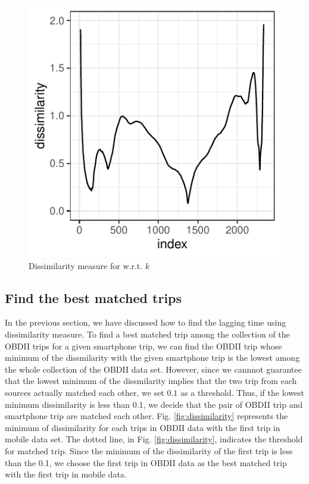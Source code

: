 \documentclass[letterpaper,9pt,twocolumn,twoside,]{pinp}
\begin{document}
\begin{figure}

{\centering \includegraphics{report_issaclee_files/figure-latex/laggedtime-1} 

}

\caption{Dissimilarity measure for w.r.t. $k$}\label{fig:laggedtime}
\end{figure}

\hypertarget{find-the-best-matched-trips}{%
\subsection{Find the best matched
trips}\label{find-the-best-matched-trips}}

In the previous section, we have discussed how to find the lagging time
using dissimilarity measure. To find a best matched trip among the
collection of the OBDII trips for a given smartphone trip, we can find
the OBDII trip whose minimum of the dissmilarity with the given
smartphone trip is the lowest among the whole collection of the OBDII
data set. However, since we cannnot guarantee that the lowest minimum of
the dissmilarity implies that the two trip from each sources actually
matched each other, we set \(0.1\) as a threshold. Thus, if the lowest
minimum dissimilarity is less than 0.1, we decide that the pair of OBDII
trip and smartphone trip are matched each other. Fig.
\ref{fig:dissimilarity} represents the minimum of dissimilarity for each
trips in OBDII data with the first trip in mobile data set. The dotted
line, in Fig. \ref{fig:dissimilarity}, indicates the threshold for
matched trip. Since the minimum of the dissimilarity of the first trip
is less than the 0.1, we choose the first trip in OBDII data as the best
matched trip with the first trip in mobile data.
\end{document}
